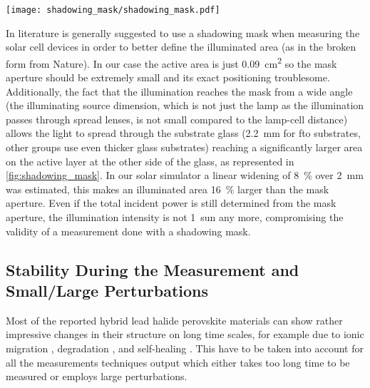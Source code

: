 		\begin{SCfigure}
			\centering
			\texttt{[image: shadowing\_mask/shadowing\_mask.pdf]}
			\label{fig:shadowing_mask}
		\end{SCfigure}

		In literature is generally suggested to use a shadowing mask when measuring the solar cell devices in order to better define the illuminated area (as in the broken \cite{Brinser2017} form from Nature\cite{NatureResearch2017}). %
		In our case the active area is just \SI{0.09}{\square\cm} so the mask aperture should be extremely small and its exact positioning troublesome. Additionally, the fact that the illumination reaches the mask from a wide angle (the illuminating source dimension, which is not just the lamp as the illumination passes through spread lenses, is not small compared to the lamp-cell distance) allows the light to spread through the substrate glass (\SI{2.2}{\mm} for \gls{fto} substrates, other groups use even thicker glass substrates) reaching a significantly larger area on the active layer at the other side of the glass, as represented in \cref{fig:shadowing_mask}. In our solar simulator a linear widening of 8~\% over \SI{2}{\mm} was estimated, this makes an illuminated area 16~\% larger than the mask aperture. Even if the total incident power is still determined from the mask aperture, the illumination intensity is not 1~sun any more, compromising the validity of a measurement done with a shadowing mask.


	\subsection{Stability During the Measurement and Small/Large Perturbations}

		Most of the reported hybrid lead halide perovskite materials can show rather impressive changes in their structure on long time scales, for example due to ionic migration \cite{Calado2016}, degradation \cite{OKane2019}, and self-healing \cite{Ceratti2018}.
		This have to be taken into account for all the measurements techniques output which either takes too long time to be measured or employs large perturbations.

